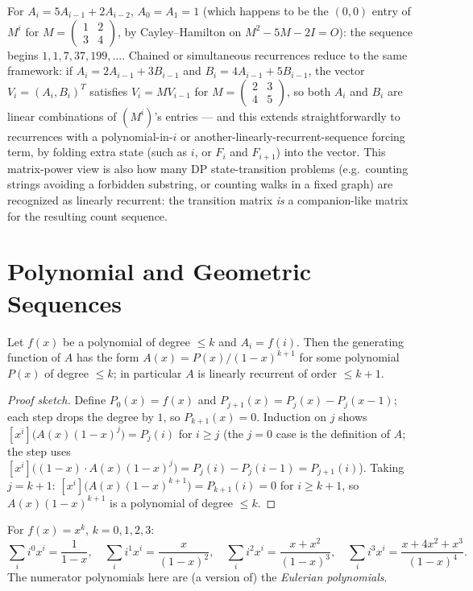 \documentclass[11pt]{article}
\begin{document}
\begin{examplebox}
For $A_i = 5A_{i-1}+2A_{i-2}$, $A_0=A_1=1$ (which happens to be the
$(0,0)$ entry of $M^i$ for $M=\begin{pmatrix}1&2\\3&4\end{pmatrix}$, by
Cayley--Hamilton on $M^2-5M-2I=O$): the sequence begins
$1,1,7,37,199,\ldots$. Chained or simultaneous recurrences reduce to the
same framework: if $A_i=2A_{i-1}+3B_{i-1}$ and $B_i=4A_{i-1}+5B_{i-1}$,
the vector $V_i=(A_i,B_i)^T$ satisfies $V_i = MV_{i-1}$ for
$M=\begin{pmatrix}2&3\\4&5\end{pmatrix}$, so both $A_i$ and $B_i$ are
linear combinations of $(M^i)$'s entries --- and this extends
straightforwardly to recurrences with a polynomial-in-$i$ or
another-linearly-recurrent-sequence forcing term, by folding extra state
(such as $i$, or $F_i$ and $F_{i+1}$) into the vector. This
matrix-power view is also how many DP state-transition problems (e.g.\
counting strings avoiding a forbidden substring, or counting walks in a
fixed graph) are recognized as linearly recurrent: the transition matrix
\emph{is} a companion-like matrix for the resulting count sequence.
\end{examplebox}

\section{Polynomial and Geometric Sequences}
\begin{theorembox}
Let $f(x)$ be a polynomial of degree $\le k$ and $A_i=f(i)$. Then the
generating function of $A$ has the form
$A(x) = P(x)/(1-x)^{k+1}$ for some polynomial $P(x)$ of degree $\le k$;
in particular $A$ is linearly recurrent of order $\le k+1$.
\end{theorembox}
\begin{proof}[Proof sketch]
Define $P_0(x)=f(x)$ and $P_{j+1}(x)=P_j(x)-P_j(x-1)$; each step drops
the degree by $1$, so $P_{k+1}(x)=0$. Induction on $j$ shows
$[x^i]\bigl(A(x)(1-x)^j\bigr) = P_j(i)$ for $i \ge j$ (the $j{=}0$ case is
the definition of $A$; the step uses
$[x^i]\bigl((1-x)\cdot A(x)(1-x)^j\bigr) = P_j(i)-P_j(i-1)=P_{j+1}(i)$).
Taking $j=k+1$: $[x^i]\bigl(A(x)(1-x)^{k+1}\bigr)=P_{k+1}(i)=0$ for
$i \ge k+1$, so $A(x)(1-x)^{k+1}$ is a polynomial of degree $\le k$.
\end{proof}

\begin{examplebox}
For $f(x)=x^k$, $k=0,1,2,3$:
\[
  \sum_i i^0x^i = \frac{1}{1-x}, \quad
  \sum_i i^1x^i = \frac{x}{(1-x)^2}, \quad
  \sum_i i^2x^i = \frac{x+x^2}{(1-x)^3}, \quad
  \sum_i i^3x^i = \frac{x+4x^2+x^3}{(1-x)^4}.
\]
The numerator polynomials here are (a version of) the \emph{Eulerian
polynomials}.
\end{examplebox}
\end{document}
